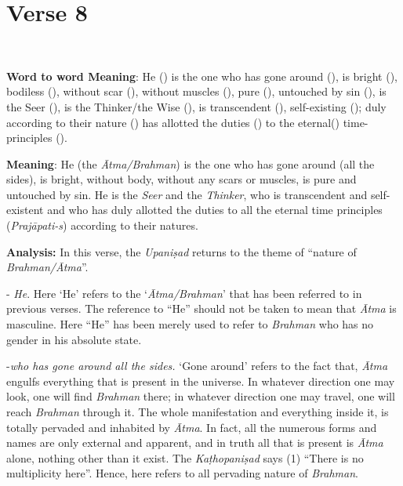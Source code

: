 \chapter{Verse 8}

\begin{moolashloka}
\\
\end{moolashloka}

\textbf{Word to word Meaning}: He () is the one who has gone around (), is bright (), bodiless (), without scar (), without muscles (), pure (), untouched by sin (), is the Seer (), is the Thinker/the Wise (), is transcendent (), self-existing (); duly according to their nature () has allotted the duties () to the eternal() time-principles ().

\textbf{Meaning}: He (the \emph{Ātma/Brahman}) is the one who has gone around (all the sides), is bright, without body, without any scars or muscles, is pure and untouched by sin. He is the \emph{Seer} and the \emph{Thinker}, who is transcendent and self-existent and who has duly allotted the duties to all the eternal time principles (\emph{Prajāpati-s}) according to their natures.

\textbf{Analysis:} In this verse, the \emph{Upaniṣad} returns to the theme of ``nature of \emph{Brahman/Ātma}''.

- \emph{He}. Here `He' refers to the `\emph{Ātma/Brahman}' that has been referred to in previous verses. The reference to ``He'' should not be taken to mean that \emph{Ātma} is masculine. Here ``He'' has been merely used to refer to \emph{Brahman} who has no gender in his absolute state.

-\emph{who has gone around all the sides.} `Gone around' refers to the fact that, \emph{Ātma} engulfs everything that is present in the universe. In whatever direction one may look, one will find \emph{Brahman} there; in whatever direction one may travel, one will reach \emph{Brahman} through it. The whole manifestation and everything inside it, is totally pervaded and inhabited by \emph{Ātma}. In fact, all the numerous forms and names are only external and apparent, and in truth all that is present is \emph{Ātma} alone, nothing other than it exist. The \emph{Kaṭhopaniṣad} says (1) ``There is no multiplicity here''. Hence, here  refers to all pervading nature of \emph{Brahman}.


